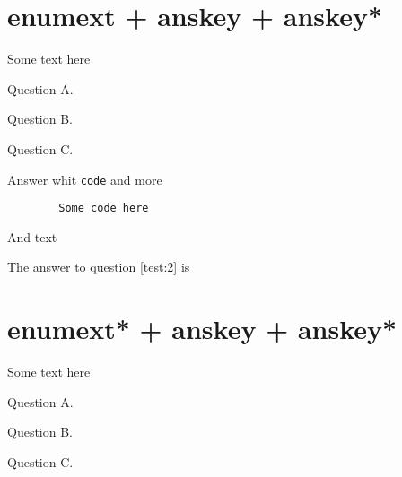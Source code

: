 \documentclass{article}
\begin{document}
\section{enumext + anskey + anskey*}

Some text here

\begin{enumext}[save-ans=test,save-sep={ },save-ref = true]
  \item Question A. 
  \item Question B. 
  \item Question C.
    \begin{anskey*}
    Answer whit \verb+code+ and more
      \begin{verbatim}
        Some code here
      \end{verbatim}
    And text
    \end{anskey*}
\end{enumext}

The answer to question \ref{test:2} is 


\section{enumext* + anskey + anskey*}

Some text here

\begin{enumext*}[save-ans=test-2,save-sep={ },save-ref = true]
  \item Question A. 
  \item Question B. 
  \item Question C.
\end{enumext*}

\end{document}
